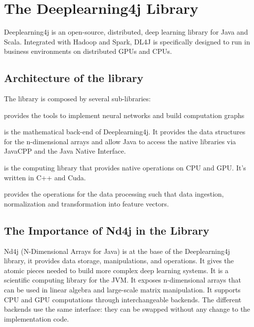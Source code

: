 \chapter{The Deeplearning4j Library}

Deeplearning4j is an open-source, distributed, deep learning library for Java and Scala. Integrated with Hadoop and Spark, DL4J is specifically designed to run in business environments on distributed GPUs and CPUs.

\section{Architecture of the library}
The library is composed by several sub-libraries:

\begin{description}[leftmargin=!,labelwidth=\widthof{\bfseries Deeplearning4j}]
	\item [Deeplearning4j] provides the tools to implement neural networks and build computation graphs
	\item [Nd4j] is the mathematical back-end of Deeplearning4j. It provides the data structures for the n-dimensional arrays and allow Java to access the native libraries via JavaCPP and the Java Native Interface.
	\item [Libnd4j] is the computing library that provides native operations on CPU and GPU. It's written in C++ and Cuda.
	\item [Datavec] provides the operations for the data processing such that data ingestion, normalization and transformation into feature vectors.
\end{description}


\section{The Importance of Nd4j in the Library}
\label{sec:nd4jBlas}

Nd4j (N-Dimensional Arrays for Java) is at the base of the Deeplearning4j library, it provides data storage, manipulations, and operations. It gives the atomic pieces needed to build more complex deep learning systems. It is a scientific computing library for the JVM.  It exposes n-dimensional arrays that can be used in linear algebra and large-scale matrix manipulation. It supports CPU and GPU computations through interchangeable backends. The different backends use the same interface: they can be swapped without any change to the implementation code.

